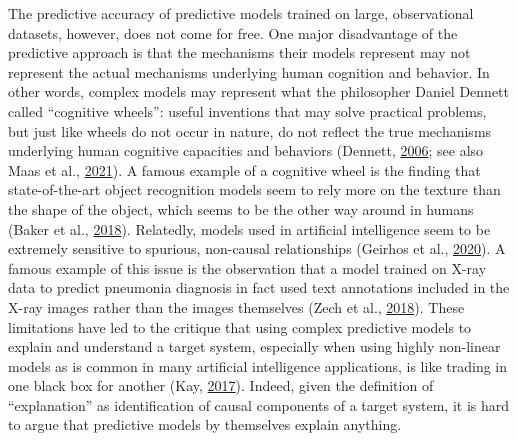\documentclass[11pt,american,]{memoir} %
\begin{document}
The predictive accuracy of predictive models trained on large, observational datasets, however, does not come for free. One major disadvantage of the predictive approach is that the mechanisms their models represent may not represent the actual mechanisms underlying human cognition and behavior. In other words, complex models may represent what the philosopher Daniel Dennett called ``cognitive wheels'': useful inventions that may solve practical problems, but just like wheels do not occur in nature, do not reflect the true mechanisms underlying human cognitive capacities and behaviors (Dennett, \protect\hyperlink{ref-Dennett2006-el}{2006}; see also Maas et al., \protect\hyperlink{ref-Van_der_Maas2021-rx}{2021}). A famous example of a cognitive wheel is the finding that state-of-the-art object recognition models seem to rely more on the texture than the shape of the object, which seems to be the other way around in humans (Baker et al., \protect\hyperlink{ref-baker2018deep}{2018}). Relatedly, models used in artificial intelligence seem to be extremely sensitive to spurious, non-causal relationships (Geirhos et al., \protect\hyperlink{ref-Geirhos2020-af}{2020}). A famous example of this issue is the observation that a model trained on X-ray data to predict pneumonia diagnosis in fact used text annotations included in the X-ray images rather than the images themselves (Zech et al., \protect\hyperlink{ref-Zech2018-bq}{2018}). These limitations have led to the critique that using complex predictive models to explain and understand a target system, especially when using highly non-linear models as is common in many artificial intelligence applications, is like trading in one black box for another (Kay, \protect\hyperlink{ref-Kay2017-vr}{2017}). Indeed, given the definition of ``explanation'' as identification of causal components of a target system, it is hard to argue that predictive models by themselves explain anything.
\end{document}
